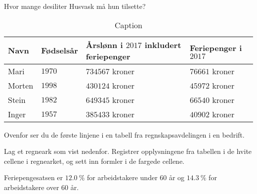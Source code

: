 \begin{oppgaver}
     Hvor mange desiliter Husvask må hun tilsette?
\end{oppgaver}

\Oppgave[5] %

\begin{table}[H]
    \centering
    \begin{tabu} to \textwidth{X Y Y[3] Y[2]}
    \hline
         Navn   & Fødselsår & Årslønn i $2017$ inkludert feriepenger & Feriepenger i $2017$  \\
    \hline
         Mari   & $1970$    & $\num{734567}$ kroner  & $\num{76661}$ kroner \\
         Morten & $1998$    & $\num{430124}$ kroner  & $\num{45972}$ kroner \\
         Stein  & $1982$    & $\num{649345}$ kroner  & $\num{66540}$ kroner \\
         Inger  & $1957$    & $\num{385433}$ kroner  & $\num{40902}$ kroner \\
    \hline
    \end{tabu}
    \caption{Caption}
    \label{tab:my_label}
\end{table}

Ovenfor ser du de første linjene i en tabell fra regnskapsavdelingen i en
bedrift. \bigskip

Lag et regneark som vist nedenfor. Registrer opplysningene fra tabellen i de
hvite cellene i regnearket, og sett inn formler i de fargede cellene. \bigskip

Feriepengesatsen er $\SI{12.0}{\percent}$ for arbeidstakere under $60$ år og
$\SI{14.3}{\percent}$ for arbeidstakere over $60$ år.



